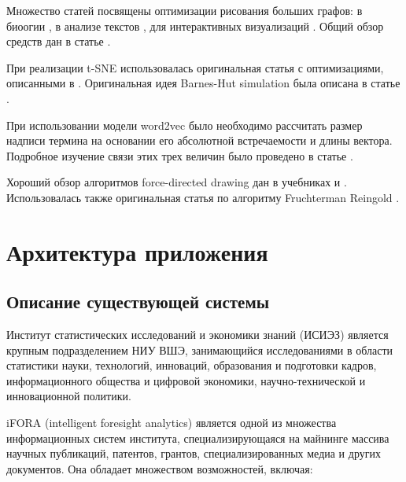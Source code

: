Множество статей посвящены оптимизации рисования больших графов: в биоогии \cite{bio_graph}, в анализе текстов \cite{large_document}, для интерактивных визуализаций \cite{interactive_large_graph}. Общий обзор средств дан в статье \cite{large_graph_survey}.

При реализации t-SNE использовалась оригинальная статья \cite{tsne} с оптимизациями, описанными в \cite{acc_tsne}. Оригинальная идея Barnes-Hut simulation была описана в статье \cite{barnes_hut}.

При использовании модели word2vec было необходимо рассчитать размер надписи термина на основании его абсолютной встречаемости и длины вектора. Подробное изучение связи этих трех величин было проведено в статье \cite{v2w_length}.

Хороший обзор алгоритмов force-directed drawing дан в учебниках \cite{book_graph_drawing} и \cite{book_force}. Использовалась также оригинальная статья по алгоритму Fruchterman Reingold \cite{fr}.


\chapter{Архитектура приложения}

\section{Описание существующей системы}

Институт статистических исследований и экономики знаний (ИСИЭЗ) является крупным подразделением НИУ ВШЭ, занимающийся исследованиями в области статистики науки, технологий, инноваций, образования и подготовки кадров, информационного общества и цифровой экономики, научно-технической и инновационной политики.

iFORA (intelligent foresight analytics) является одной из множества информационных систем института, специализирующаяся на майнинге массива научных публикаций, патентов, грантов, специализированных медиа и других документов. Она обладает множеством возможностей, включая:

